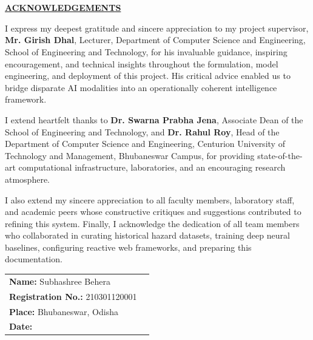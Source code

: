 \documentclass{article}
\begin{document}
\vfill
\newpage

\section*{}
\begin{center}
\underline{\LARGE \textbf{ACKNOWLEDGEMENTS}}\\[1.2cm]
\end{center}
\large
I express my deepest gratitude and sincere appreciation to my project supervisor, \textbf{Mr. Girish Dhal}, Lecturer, Department of Computer Science and Engineering, School of Engineering and Technology, for his invaluable guidance, inspiring encouragement, and technical insights throughout the formulation, model engineering, and deployment of this project. His critical advice enabled us to bridge disparate AI modalities into an operationally coherent intelligence framework.

I extend heartfelt thanks to \textbf{Dr. Swarna Prabha Jena}, Associate Dean of the School of Engineering and Technology, and \textbf{Dr. Rahul Roy}, Head of the Department of Computer Science and Engineering, Centurion University of Technology and Management, Bhubaneswar Campus, for providing state-of-the-art computational infrastructure, laboratories, and an encouraging research atmosphere.

I also extend my sincere appreciation to all faculty members, laboratory staff, and academic peers whose constructive critiques and suggestions contributed to refining this system. Finally, I acknowledge the dedication of all team members who collaborated in curating historical hazard datasets, training deep neural baselines, configuring reactive web frameworks, and preparing this documentation.

\vspace{2.5cm}

\begin{tabular}{lr}
\textbf{Name:} Subhashree Behera\\
\textbf{Registration No.:} 210301120001\\
\textbf{Place:} Bhubaneswar, Odisha\\
\textbf{Date:}
\end{tabular}

\vfill
\end{document}
